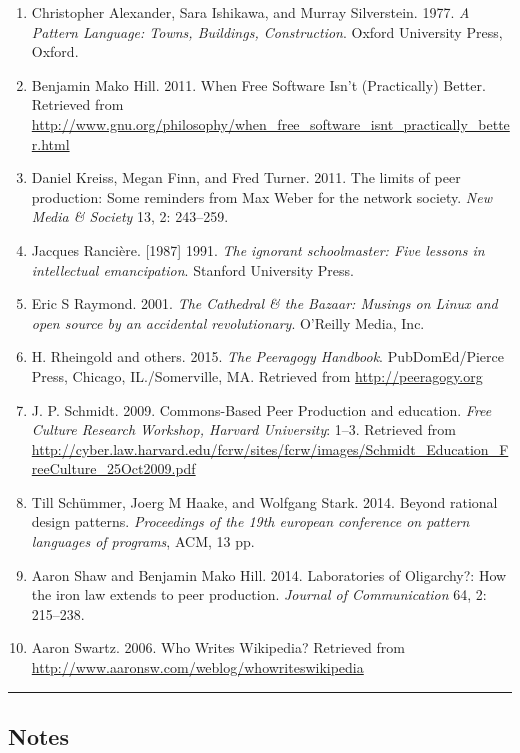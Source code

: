 \begin{enumerate}
\def\labelenumi{\arabic{enumi}.}
\item
  Christopher Alexander, Sara Ishikawa, and Murray Silverstein. 1977.
  \emph{A Pattern Language: Towns, Buildings, Construction}. Oxford
  University Press, Oxford.
\item
  Benjamin Mako Hill. 2011. When Free Software Isn't (Practically)
  Better. Retrieved from
  \url{http://www.gnu.org/philosophy/when_free_software_isnt_practically_better.html}
\item
  Daniel Kreiss, Megan Finn, and Fred Turner. 2011. The limits of peer
  production: Some reminders from Max Weber for the network society.
  \emph{New Media \& Society} 13, 2: 243--259.
\item
  Jacques Rancière. {[}1987{]} 1991. \emph{The ignorant schoolmaster:
  Five lessons in intellectual emancipation}. Stanford University Press.
\item
  Eric S Raymond. 2001. \emph{The Cathedral \& the Bazaar: Musings on
  Linux and open source by an accidental revolutionary}. O'Reilly Media,
  Inc.
\item
  H. Rheingold and others. 2015. \emph{The Peeragogy Handbook}.
  PubDomEd/Pierce Press, Chicago, IL./Somerville, MA. Retrieved from
  \url{http://peeragogy.org}
\item
  J. P. Schmidt. 2009. Commons-Based Peer Production and education.
  \emph{Free Culture Research Workshop, Harvard University}: 1--3.
  Retrieved from
  \url{http://cyber.law.harvard.edu/fcrw/sites/fcrw/images/Schmidt_Education_FreeCulture_25Oct2009.pdf}
\item
  Till Schümmer, Joerg M Haake, and Wolfgang Stark. 2014. Beyond
  rational design patterns. \emph{Proceedings of the 19th european
  conference on pattern languages of programs}, ACM, 13 pp.
\item
  Aaron Shaw and Benjamin Mako Hill. 2014. Laboratories of Oligarchy?:
  How the iron law extends to peer production. \emph{Journal of
  Communication} 64, 2: 215--238.
\item
  Aaron Swartz. 2006. Who Writes Wikipedia? Retrieved from
  \url{http://www.aaronsw.com/weblog/whowriteswikipedia}
\end{enumerate}

\begin{center}\rule{0.5\linewidth}{0.5pt}\end{center}

\hypertarget{notes}{%
\subsection{Notes}\label{notes}}
